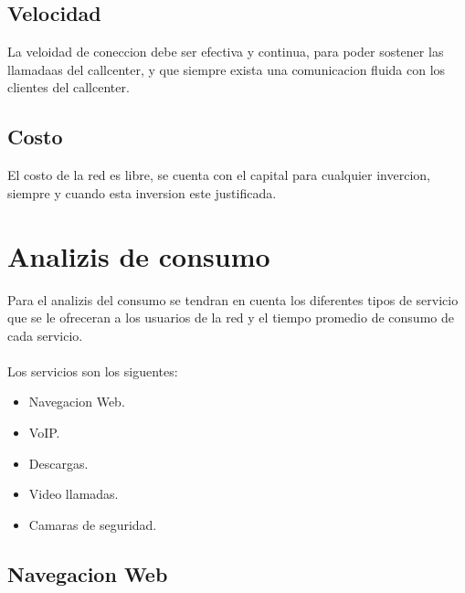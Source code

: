 \documentclass[12pt]{article}
\begin{document}
\subsection{\textbf{Velocidad}}
La veloidad de coneccion debe ser efectiva y continua, para poder sostener las llamadaas del callcenter, y que siempre exista una comunicacion fluida con los clientes del callcenter.

\subsection{\textbf{Costo}}
El costo de la red es libre, se cuenta con el capital para cualquier invercion, siempre y cuando esta inversion este justificada.

\pagebreak
\section{\textbf{Analizis de consumo}}
Para el analizis del consumo se tendran en cuenta los diferentes tipos de servicio que se le ofreceran a los usuarios de la red y el tiempo promedio de consumo de cada servicio.\\\\
Los servicios son los siguentes:
\begin{itemize}
\item
Navegacion Web.
\item
VoIP.
\item
Descargas.
\item
Video llamadas.
\item
Camaras de seguridad.
\end{itemize}

\subsection{\textbf{Navegacion Web}}



\end{document}
